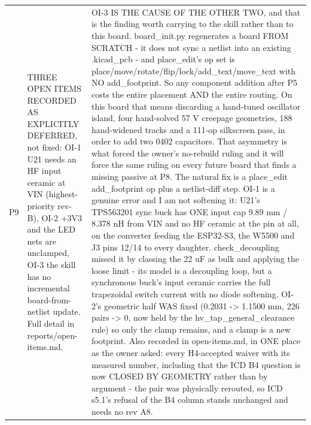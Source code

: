 \documentclass[11pt,a4paper]{article}
\begin{document}
{\begin{longtable}{lp{5.2cm}p{7.2cm}}
P9 & THREE OPEN ITEMS RECORDED AS EXPLICITLY DEFERRED, not fixed: OI-1 U21 needs an HF input ceramic at VIN (highest-priority rev-B), OI-2 +3V3 and the LED nets are unclamped, OI-3 the skill has no incremental board-from-netlist update. Full detail in reports/open-items.md. & OI-3 IS THE CAUSE OF THE OTHER TWO, and that is the finding worth carrying to the skill rather than to this board. board\_init.py regenerates a board FROM SCRATCH - it does not sync a netlist into an existing .kicad\_pcb - and place\_edit's op set is place/move/rotate/flip/lock/add\_text/move\_text with NO add\_footprint. So any component addition after P5 costs the entire placement AND the entire routing. On this board that means discarding a hand-tuned oscillator island, four hand-solved 57 V creepage geometries, 188 hand-widened tracks and a 111-op silkscreen pass, in order to add two 0402 capacitors. That asymmetry is what forced the owner's no-rebuild ruling and it will force the same ruling on every future board that finds a missing passive at P8. The natural fix is a place\_edit add\_footprint op plus a netlist-diff step. OI-1 is a genuine error and I am not softening it: U21's TPS563201 sync buck has ONE input cap 9.89 mm / 8.378 nH from VIN and no HF ceramic at the pin at all, on the converter feeding the ESP32-S3, the W5500 and J3 pins 12/14 to every daughter. check\_decoupling missed it by classing the 22 uF as bulk and applying the loose limit - its model is a decoupling loop, but a synchronous buck's input ceramic carries the full trapezoidal switch current with no diode softening. OI-2's geometric half WAS fixed (0.2031 -\textgreater{} 1.1500 mm, 226 pairs -\textgreater{} 0, now held by the hv\_tap\_general\_clearance rule) so only the clamp remains, and a clamp is a new footprint. Also recorded in open-items.md, in ONE place as the owner asked: every H4-accepted waiver with its measured number, including that the ICD B4 question is now CLOSED BY GEOMETRY rather than by argument - the pair was physically rerouted, so ICD s5.1's refusal of the B4 column stands unchanged and needs no rev A8. \\

\end{longtable}}
\end{document}
